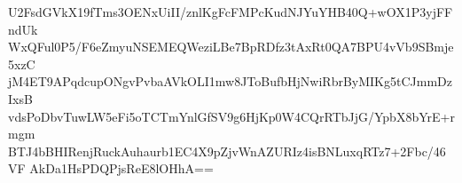 U2FsdGVkX19fTms3OENxUiII/znlKgFcFMPcKudNJYuYHB40Q+wOX1P3yjFFndUk
WxQFul0P5/F6eZmyuNSEMEQWeziLBe7BpRDfz3tAxRt0QA7BPU4vVb9SBmje5xzC
jM4ET9APqdcupONgvPvbaAVkOLI1mw8JToBufbHjNwiRbrByMIKg5tCJmmDzIxsB
vdsPoDbvTuwLW5eFi5oTCTmYnlGfSV9g6HjKp0W4CQrRTbJjG/YpbX8bYrE+rmgm
BTJ4bBHIRenjRuckAuhaurb1EC4X9pZjvWnAZURIz4isBNLuxqRTz7+2Fbc/46VF
AkDa1HsPDQPjsReE8lOHhA==
